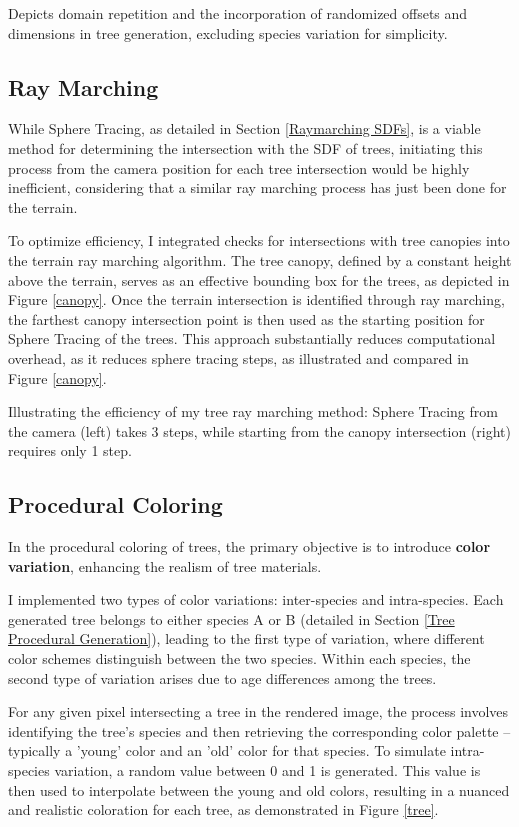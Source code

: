 {Depicts domain repetition and the incorporation of randomized offsets and dimensions in tree generation, excluding species variation for simplicity.}

\subsection{Ray Marching}

While Sphere Tracing, as detailed in Section \ref{Raymarching SDFs}, is a viable method for determining the intersection with the SDF of trees, initiating this process from the camera position for each tree intersection would be highly inefficient, considering that a similar ray marching process has just been done for the terrain.

To optimize efficiency, I integrated checks for intersections with tree canopies into the terrain ray marching algorithm. The tree canopy, defined by a constant height above the terrain, serves as an effective bounding box for the trees, as depicted in Figure \ref{canopy}. Once the terrain intersection is identified through ray marching, the farthest canopy intersection point is then used as the starting position for Sphere Tracing of the trees. This approach substantially reduces computational overhead, as it reduces sphere tracing steps, as illustrated and compared in Figure \ref{canopy}. 

{Illustrating the efficiency of my tree ray marching method: Sphere Tracing from the camera (left) takes 3 steps, while starting from the canopy intersection (right) requires only 1 step.}

\subsection{Procedural Coloring}

In the procedural coloring of trees, the primary objective is to introduce \textbf{color variation}, enhancing the realism of tree materials. 

I implemented two types of color variations: inter-species and intra-species. Each generated tree belongs to either species A or B (detailed in Section \ref{Tree Procedural Generation}), leading to the first type of variation, where different color schemes distinguish between the two species. Within each species, the second type of variation arises due to age differences among the trees. 

For any given pixel intersecting a tree in the rendered image, the process involves identifying the tree's species and then retrieving the corresponding color palette -- typically a 'young' color and an 'old' color for that species. To simulate intra-species variation, a random value between 0 and 1 is generated. This value is then used to interpolate between the young and old colors, resulting in a nuanced and realistic coloration for each tree, as demonstrated in Figure \ref{tree}.

